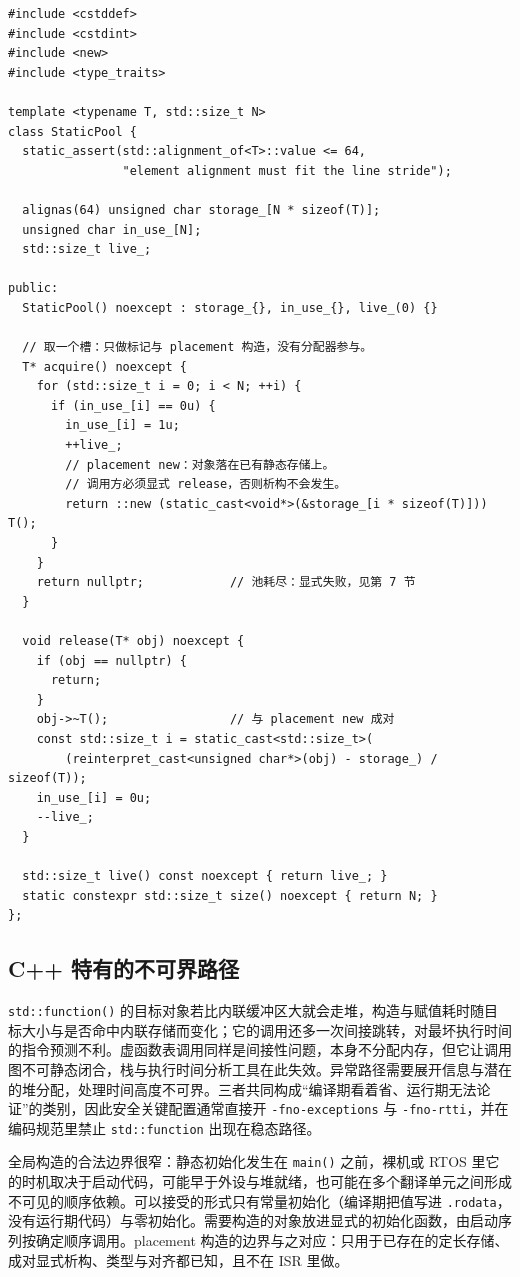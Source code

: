 \documentclass[12pt,a4paper,fontset=fandol]{ctexbook}
\newcommand{\Fn}[1]{\texttt{#1()}}
\newcommand{\Tp}[1]{\texttt{#1}}
\newcommand{\Lang}[1]{\textsf{#1}}
\newcommand{\CPP}{\Lang{C++}}
\newcommand{\DomRtos}{\Lang{RTOS}}
\begin{document}
\begin{lstlisting}[style=cppstyle,caption={C++：静态对象池与 placement 构造（运行期零分配）},label={lst:ch09-pool-placement}]
#include <cstddef>
#include <cstdint>
#include <new>
#include <type_traits>

template <typename T, std::size_t N>
class StaticPool {
  static_assert(std::alignment_of<T>::value <= 64,
                "element alignment must fit the line stride");

  alignas(64) unsigned char storage_[N * sizeof(T)];
  unsigned char in_use_[N];
  std::size_t live_;

public:
  StaticPool() noexcept : storage_{}, in_use_{}, live_(0) {}

  // 取一个槽：只做标记与 placement 构造，没有分配器参与。
  T* acquire() noexcept {
    for (std::size_t i = 0; i < N; ++i) {
      if (in_use_[i] == 0u) {
        in_use_[i] = 1u;
        ++live_;
        // placement new：对象落在已有静态存储上。
        // 调用方必须显式 release，否则析构不会发生。
        return ::new (static_cast<void*>(&storage_[i * sizeof(T)])) T();
      }
    }
    return nullptr;            // 池耗尽：显式失败，见第 7 节
  }

  void release(T* obj) noexcept {
    if (obj == nullptr) {
      return;
    }
    obj->~T();                 // 与 placement new 成对
    const std::size_t i = static_cast<std::size_t>(
        (reinterpret_cast<unsigned char*>(obj) - storage_) / sizeof(T));
    in_use_[i] = 0u;
    --live_;
  }

  std::size_t live() const noexcept { return live_; }
  static constexpr std::size_t size() noexcept { return N; }
};
\end{lstlisting}

\subsection*{\CPP{} 特有的不可界路径}

\Fn{std::function} 的目标对象若比内联缓冲区大就会走堆，构造与赋值耗时随目标大小与是否命中内联存储而变化；它的调用还多一次间接跳转，对最坏执行时间的指令预测不利。虚函数表调用同样是间接性问题，本身不分配内存，但它让调用图不可静态闭合，栈与执行时间分析工具在此失效。异常路径需要展开信息与潜在的堆分配，处理时间高度不可界。三者共同构成“编译期看着省、运行期无法论证”的类别，因此安全关键配置通常直接开 \texttt{-fno-exceptions} 与 \texttt{-fno-rtti}，并在编码规范里禁止 \Tp{std::function} 出现在稳态路径。

全局构造的合法边界很窄：静态初始化发生在 \Fn{main} 之前，裸机或 \DomRtos{} 里它的时机取决于启动代码，可能早于外设与堆就绪，也可能在多个翻译单元之间形成不可见的顺序依赖。可以接受的形式只有常量初始化（编译期把值写进 \texttt{.rodata}，没有运行期代码）与零初始化。需要构造的对象放进显式的初始化函数，由启动序列按确定顺序调用。placement 构造的边界与之对应：只用于已存在的定长存储、成对显式析构、类型与对齐都已知，且不在 ISR 里做。
\end{document}
